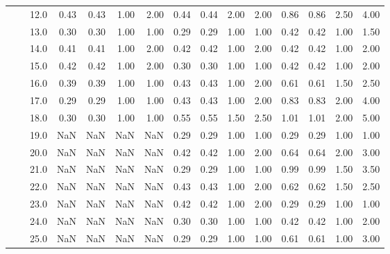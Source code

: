 \begin{tabular}{lllrrrrrrrrrrrr}
           &     & 12.0 &       0.43 &      0.43 & 1.00 &   2.00 &       0.44 &      0.44 & 2.00 &   2.00 &       0.86 &      0.86 & 2.50 &   4.00 \\
           &     & 13.0 &       0.30 &      0.30 & 1.00 &   1.00 &       0.29 &      0.29 & 1.00 &   1.00 &       0.42 &      0.42 & 1.00 &   1.50 \\
           &     & 14.0 &       0.41 &      0.41 & 1.00 &   2.00 &       0.42 &      0.42 & 1.00 &   2.00 &       0.42 &      0.42 & 1.00 &   2.00 \\
           &     & 15.0 &       0.42 &      0.42 & 1.00 &   2.00 &       0.30 &      0.30 & 1.00 &   1.00 &       0.42 &      0.42 & 1.00 &   2.00 \\
           &     & 16.0 &       0.39 &      0.39 & 1.00 &   1.00 &       0.43 &      0.43 & 1.00 &   2.00 &       0.61 &      0.61 & 1.50 &   2.50 \\
           &     & 17.0 &       0.29 &      0.29 & 1.00 &   1.00 &       0.43 &      0.43 & 1.00 &   2.00 &       0.83 &      0.83 & 2.00 &   4.00 \\
           &     & 18.0 &       0.30 &      0.30 & 1.00 &   1.00 &       0.55 &      0.55 & 1.50 &   2.50 &       1.01 &      1.01 & 2.00 &   5.00 \\
           &     & 19.0 &        NaN &       NaN &  NaN &    NaN &       0.29 &      0.29 & 1.00 &   1.00 &       0.29 &      0.29 & 1.00 &   1.00 \\
           &     & 20.0 &        NaN &       NaN &  NaN &    NaN &       0.42 &      0.42 & 1.00 &   2.00 &       0.64 &      0.64 & 2.00 &   3.00 \\
           &     & 21.0 &        NaN &       NaN &  NaN &    NaN &       0.29 &      0.29 & 1.00 &   1.00 &       0.99 &      0.99 & 1.50 &   3.50 \\
           &     & 22.0 &        NaN &       NaN &  NaN &    NaN &       0.43 &      0.43 & 1.00 &   2.00 &       0.62 &      0.62 & 1.50 &   2.50 \\
           &     & 23.0 &        NaN &       NaN &  NaN &    NaN &       0.42 &      0.42 & 1.00 &   2.00 &       0.29 &      0.29 & 1.00 &   1.00 \\
           &     & 24.0 &        NaN &       NaN &  NaN &    NaN &       0.30 &      0.30 & 1.00 &   1.00 &       0.42 &      0.42 & 1.00 &   2.00 \\
           &     & 25.0 &        NaN &       NaN &  NaN &    NaN &       0.29 &      0.29 & 1.00 &   1.00 &       0.61 &      0.61 & 1.00 &   3.00 \\

\end{tabular}
